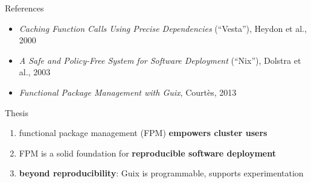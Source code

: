 \documentclass{beamer}
\begin{document}
\begin{frame}{References}
  \Large{
    \begin{itemize}
    \item<3-> \textit{Caching Function Calls Using Precise Dependencies}
      (``Vesta''), Heydon et al., 2000
    \item \textit{A Safe and Policy-Free System for Software Deployment}
      (``Nix''), Dolstra et al., 2003
    \item<2-> \textit{Functional Package Management with Guix}, Courtès,
      2013
    \end{itemize}
  }
\end{frame}

\begin{frame}{Thesis}

  \Large{
    \begin{enumerate}
    \item functional package management (FPM) \textbf{empowers cluster
      users}
    \item FPM is a solid foundation for \textbf{reproducible software
      deployment}
    \item \textbf{beyond reproducibility}: Guix is programmable, supports
      experimentation
    \end{enumerate}
  }
\end{frame}
\end{document}
